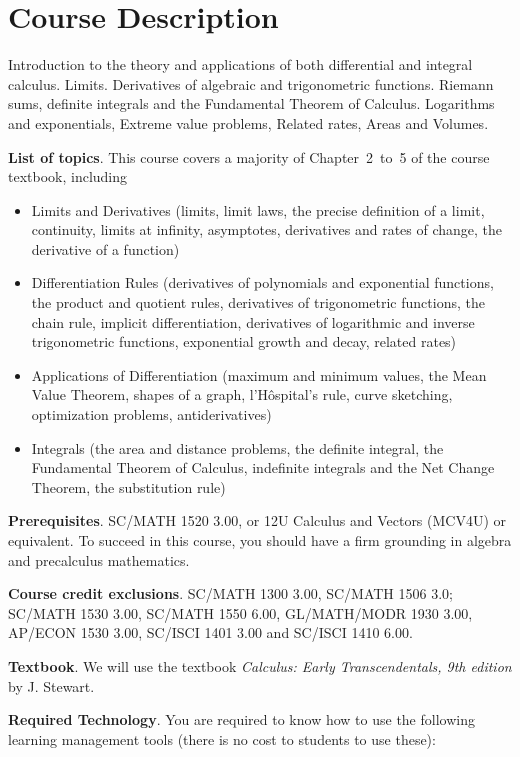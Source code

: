 \documentclass[./main.tex]{subfiles}
\begin{document}
\section*{Course Description}

Introduction to the theory and applications of both differential and integral calculus. Limits. Derivatives of algebraic and trigonometric functions. Riemann sums, definite integrals and the Fundamental Theorem of Calculus. Logarithms and exponentials, Extreme value problems, Related rates, Areas and Volumes. 

\textbf{List of topics}. This course covers a majority of Chapter~2~to~5 of the course textbook, including

\begin{itemize}
\item Limits and Derivatives (limits, limit laws, the precise definition of a limit, continuity, limits at infinity, asymptotes, derivatives and rates of change, the derivative of a function)
\item Differentiation Rules (derivatives of polynomials and exponential functions, the product and quotient rules, derivatives of trigonometric functions, the chain rule, implicit differentiation, derivatives of logarithmic and inverse trigonometric functions, exponential growth and decay, related rates)
\item Applications of Differentiation (maximum and minimum values, the Mean Value Theorem, shapes of a graph, l'H\^{o}spital's rule, curve sketching, optimization problems, antiderivatives)
\item Integrals (the area and distance problems, the definite integral, the Fundamental Theorem of Calculus, indefinite integrals and the Net Change Theorem, the substitution rule)
\end{itemize}

\textbf{Prerequisites}. SC/MATH 1520 3.00, or 12U Calculus and Vectors (MCV4U) or equivalent. To succeed in this course, you should have a firm grounding in algebra and precalculus mathematics.

\textbf{Course credit exclusions}. SC/MATH 1300 3.00, SC/MATH 1506 3.0; SC/MATH 1530 3.00, SC/MATH 1550 6.00, GL/MATH/MODR 1930 3.00, AP/ECON 1530 3.00, SC/ISCI 1401 3.00 and SC/ISCI 1410 6.00.

\textbf{Textbook}. We will use the textbook \textit{Calculus: Early Transcendentals, 9th edition} by J. Stewart.

\textbf{Required Technology}. You are required to know how to use the following learning management tools (there is no cost to students to use these): 
\end{document}
